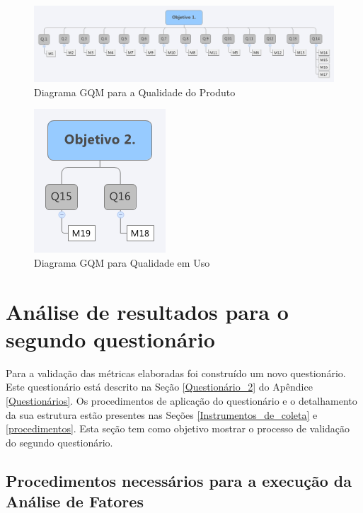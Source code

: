 \begin{figure}[h]
\centering
\includegraphics[keepaspectratio=true,scale=0.45]{figuras/GQM-Diagrama1.png}
\caption{Diagrama GQM para a Qualidade do Produto}
\label{GQM-Diagrama_1}
\end{figure}



\begin{figure}[h]
\centering
\includegraphics[keepaspectratio=true,scale=0.8]{figuras/GQM-Diagrama2.png}
\caption{Diagrama GQM para Qualidade em Uso }
\label{GQM-Diagrama_2}
\end{figure}

\clearpage
\section{Análise de resultados para o segundo questionário}
\label{resultados_quest2}

Para a validação das métricas elaboradas foi construído um novo questionário. Este questionário está descrito na Seção \ref{Questionário_2} do Apêndice \ref{Questionários}. Os procedimentos de aplicação do questionário e o detalhamento da sua estrutura estão presentes nas Seções \ref{Instrumentos_de_coleta} e \ref{procedimentos}. Esta seção tem como objetivo mostrar o processo de validação do segundo questionário.

\subsection{Procedimentos necessários para a execução da Análise de Fatores}

